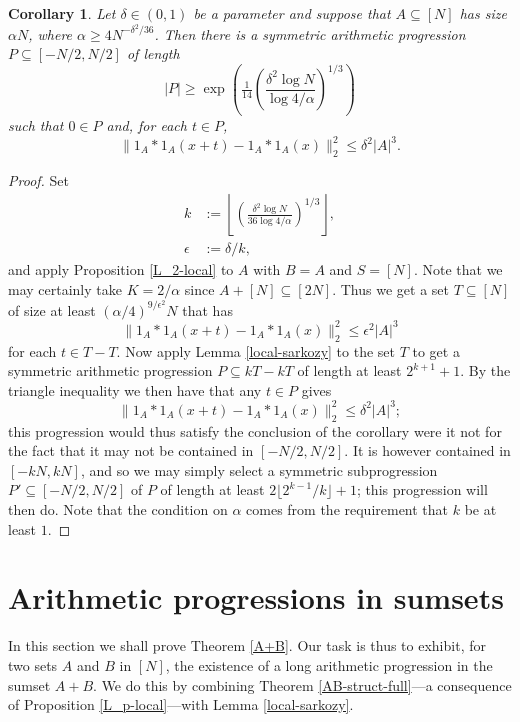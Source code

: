 \documentclass[12pt,a4paper,reqno]{amsart}
\numberwithin{equation}{section}
\theoremstyle{plain}
\newtheorem{corollary}[theorem]{Corollary}
\theoremstyle{definition}
\renewcommand{\leq}{\leqslant}
\renewcommand{\geq}{\geqslant}
\renewcommand{\subset}{\subseteq}
\providecommand{\norm}[1]{\lVert#1\rVert}
\begin{document}
\begin{corollary}\label{main_L2_corollary}
Let $\delta \in (0,1)$ be a parameter and suppose that $A \subset [N]$ has size $\alpha N$, where $\alpha \geq 4N^{-\delta^2/36}$. Then there is a symmetric arithmetic progression $P \subset [-N/2,N/2]$ of length 
\[ |P| \geq \exp\left( \tfrac{1}{14} \left( \frac{\delta^2 \log{N}}{\log{4/\alpha}} \right)^{1/3} \right) \]
such that $0 \in P$ and, for each $t \in P$,
\[ \norm{ 1_A*1_A(x+t) - 1_A*1_A(x) }_2^2 \leq \delta^2 |A|^3. \]
\end{corollary}
\begin{proof}
Set
\begin{align*}
k &:= \left\lfloor \left(\frac{\delta^2 \log{N}}{36\log{4/\alpha}}\right)^{1/3} \right\rfloor, \\
\epsilon &:= \delta/k,
\end{align*}
and apply Proposition \ref{L_2-local} to $A$ with $B=A$ and $S = [N]$. Note that we may certainly take $K = 2/\alpha$ since $A + [N] \subset [2N]$. Thus we get a set $T \subset [N]$ of size at least $(\alpha/4)^{9/\epsilon^2} N$ that has 
\[ \norm{ 1_A*1_A(x+t) - 1_A*1_A(x) }_2^2 \leq \epsilon^2 |A|^3 \]
for each $t \in T-T$. Now apply Lemma \ref{local-sarkozy} to the set $T$ to get a symmetric arithmetic progression $P \subset kT-kT$ of length at least $2^{k+1}+1$. By the triangle inequality we then have that any $t \in P$ gives
\[ \norm{ 1_A*1_A(x+t) - 1_A*1_A(x) }_2^2 \leq \delta^2 |A|^3; \]
this progression would thus satisfy the conclusion of the corollary were it not for the fact that it may not be contained in $[-N/2,N/2]$. It is however contained in $[-kN,kN]$, and so we may simply select a symmetric subprogression $P' \subset [-N/2,N/2]$ of $P$ of length at least $2\lfloor 2^{k-1}/k \rfloor + 1$; this progression will then do. Note that the condition on $\alpha$ comes from the requirement that $k$ be at least $1$.
\end{proof}

\section{Arithmetic progressions in sumsets}\label{longAPs}

In this section we shall prove Theorem \ref{A+B}. Our task is thus to exhibit, for two sets $A$ and $B$ in $[N]$, the existence of a long arithmetic progression in the sumset $A+B$. We do this by combining Theorem \ref{AB-struct-full}---a consequence of Proposition \ref{L_p-local}---with Lemma \ref{local-sarkozy}.
\end{document}
